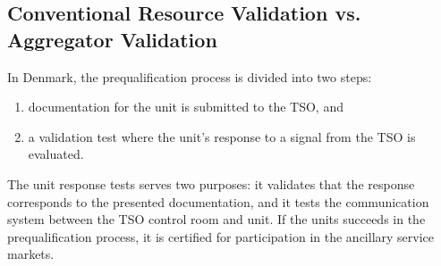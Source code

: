 \subsection{Conventional Resource Validation vs. Aggregator Validation}\label{subsec:backgroundvalidation}
In Denmark, the prequalification process is divided into two steps:
\begin{enumerate}
	\item documentation for the unit is submitted to the TSO, and
	\item a validation test where the unit's response to a signal from the TSO is evaluated.
\end{enumerate}

The unit response tests serves two purposes: it validates that the response corresponds to the presented documentation, and it tests the communication system between the TSO control room and unit. If the units succeeds in the prequalification process, it is certified for participation in the ancillary service markets.

